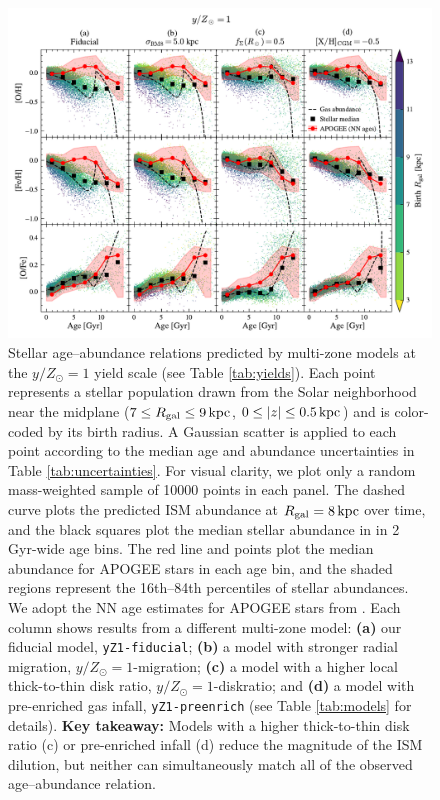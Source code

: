 \documentclass[twocolumn,twocolappendix,linenumbers]{aastex631}
\newcommand{\yZ}[1]{$y/Z_\odot=#1$}
\newcommand{\kpc}{\,{\rm kpc}}
\begin{document}
\begin{figure}
    \centering
    \includegraphics[width=\linewidth]{figures/stellar_abundance_evolution.pdf}
    \caption{Stellar age--abundance relations predicted by multi-zone models at the \yZ{1} yield scale (see Table \ref{tab:yields}). Each point represents a stellar population drawn from the Solar neighborhood near the midplane ($7\leq R_{\rm gal}\leq 9\kpc$, $0\leq |z| \leq 0.5\kpc$) and is color-coded by its birth radius. A Gaussian scatter is applied to each point according to the median age and abundance uncertainties in Table \ref{tab:uncertainties}. For visual clarity, we plot only a random mass-weighted sample of \num{10000} points in each panel. The dashed curve plots the predicted ISM abundance at $R_{\rm gal}=8\kpc$ over time, and the black squares plot the median stellar abundance in in {2 Gyr}-wide age bins. The red line and points plot the median abundance for APOGEE stars in each age bin, and the shaded regions represent the 16th--84th percentiles of stellar abundances. We adopt the NN age estimates for APOGEE stars from \citet{leung_variational_2023}.
    Each column shows results from a different multi-zone model: {\bf (a)} our fiducial model, {\tt yZ1-fiducial}; {\bf (b)} a model with stronger radial migration, {\yZ1-migration}; {\bf (c)} a model with a higher local thick-to-thin disk ratio, {\yZ1-diskratio}; and {\bf (d)} a model with pre-enriched gas infall, {\tt yZ1-preenrich} (see Table \ref{tab:models} for details). {\bf Key takeaway:} Models with a higher thick-to-thin disk ratio (c) or pre-enriched infall (d) reduce the magnitude of the ISM dilution, but neither can simultaneously match all of the observed age--abundance relation.}
    \label{fig:abundance-evolution-params}
\end{figure}
\end{document}
